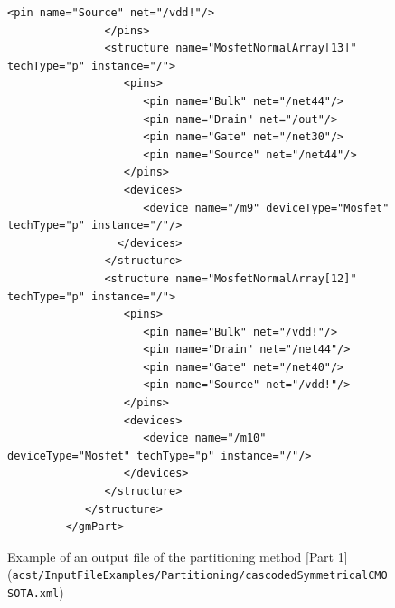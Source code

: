 \begin{figure}[H]
\begin{lstlisting}[basicstyle=\ttfamily\scriptsize,backgroundcolor={\color{gray!30}}, escapechar=? ]
                  <pin name="Source" net="/vdd!"/>
               </pins>
               <structure name="MosfetNormalArray[13]" techType="p" instance="/">
                  <pins>
                     <pin name="Bulk" net="/net44"/>
                     <pin name="Drain" net="/out"/>
                     <pin name="Gate" net="/net30"/>
                     <pin name="Source" net="/net44"/>
                  </pins>
                  <devices>
                     <device name="/m9" deviceType="Mosfet" techType="p" instance="/"/>
                 </devices>
               </structure>
               <structure name="MosfetNormalArray[12]" techType="p" instance="/">
                  <pins>
                     <pin name="Bulk" net="/vdd!"/>
                     <pin name="Drain" net="/net44"/>
                     <pin name="Gate" net="/net40"/>
                     <pin name="Source" net="/vdd!"/>
                  </pins>
                  <devices>
                     <device name="/m10" deviceType="Mosfet" techType="p" instance="/"/>
                  </devices>
               </structure>
            </structure>
         </gmPart>
	\end{lstlisting}
	\caption{Example of an output file of the partitioning method [Part 1] ({\tt acst/InputFileExamples/Partitioning/cascodedSymmetricalCMOSOTA.xml})}
\end{figure}

